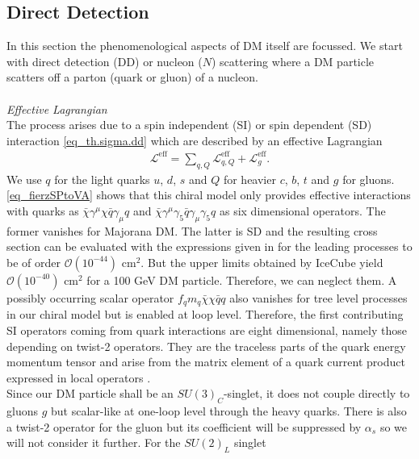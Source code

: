 \subsection{Direct Detection}
\label{sec_ddphen}
In this section the phenomenological aspects of DM itself are focussed.
We start with direct detection (DD) or nucleon ($N$) scattering where a DM particle scatters off a parton (quark or gluon) of a nucleon. 
\\ \\ \textit{Effective Lagrangian}\\
The process arises
due to a spin independent (SI) or spin dependent (SD) interaction \eqref{eq_th.sigma.dd} which are described by an effective Lagrangian \cite{1104.0228}
\begin{align}
 \mathcal{L}^\text{eff} = \sum\limits_{q,Q} \mathcal{L}^\text{eff}_{q,Q} + \mathcal{L}^\text{eff}_g.
\end{align}
We use $q$ for the light quarks $u$, $d$, $s$ and $Q$ for heavier $c$, $b$, $t$ and $g$ for gluons. \eqref{eq_fierzSPtoVA} shows that this chiral model
only provides effective interactions with quarks as $\bar \chi\gamma^\mu\chi \bar q\gamma_\mu q$ and $\bar \chi\gamma^\mu\gamma_5 \bar q\gamma_\mu \gamma_5 q$
as six dimensional operators. The former vanishes for Majorana DM. The latter is SD 
and the resulting cross section can be evaluated with the expressions given in \cite{1104.0228} for the leading processes to be of
order $\mathcal{O}(10^{-44})$ cm$^2$. But the upper limits obtained by IceCube \cite{1212.4097} yield $\mathcal{O}(10^{-40})$ cm$^2$ for 
a 100 GeV DM particle.
Therefore, we can neglect them. A possibly occurring scalar operator $f_q m_q\bar \chi \chi \bar q q$ also vanishes for tree level processes in our chiral model
but is enabled at loop level. Therefore, the first contributing
SI operators coming from quark interactions are eight dimensional, namely those depending on twist-2 operators. They are the traceless parts of the
quark energy momentum tensor and arise from the matrix element of a quark current product expressed in local operators \cite{MDSchwartz}. 
\\ \noindent Since our DM particle shall be an 
$SU(3)_C$-singlet, it does not couple directly to gluons $g$ but scalar-like at one-loop level through the heavy quarks. There is also a twist-2 
operator for the gluon but its coefficient will be suppressed by $\alpha_s$ so we will not consider it further. For the $SU(2)_L$ singlet
